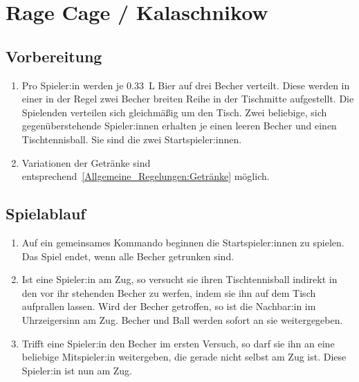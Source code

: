 \chapter{Rage Cage / Kalaschnikow}
\section{Vorbereitung}
\begin{enumerate}[label={(\arabic*)}]
    \item
    Pro Spieler:in werden je \SI{0,33}{\liter} Bier auf drei Becher verteilt.
    Diese werden in einer in der Regel zwei Becher breiten Reihe in der Tischmitte aufgestellt.
    Die Spielenden verteilen sich gleichmäßig um den Tisch.
    Zwei beliebige, sich gegenüberstehende Spieler:innen erhalten je einen leeren Becher und einen Tischtennisball.
    Sie sind die zwei Startspieler:innen.

    \item
    Variationen der Getränke sind entsprechend~\ref{Allgemeine_Regelungen:Getränke} möglich.
\end{enumerate}

\section{Spielablauf}
\begin{enumerate}[label={(\arabic*)}]
    \item
    Auf ein gemeinsames Kommando beginnen die Startspieler:innen zu spielen.
    Das Spiel endet, wenn alle Becher getrunken sind.

    \item
    Ist eine Spieler:in am Zug, so versucht sie ihren Tischtennisball indirekt in den vor ihr stehenden Becher zu werfen, indem sie ihn auf dem Tisch aufprallen lassen.
    Wird der Becher getroffen, so ist die Nachbar:in im Uhrzeigersinn am Zug.
    Becher und Ball werden sofort an sie weitergegeben.

    \item
    Trifft eine Spieler:in den Becher im ersten Versuch, so darf sie ihn an eine beliebige Mitspieler:in weitergeben, die gerade nicht selbst am Zug ist.
    Diese Spieler:in ist nun am Zug.
\end{enumerate}

